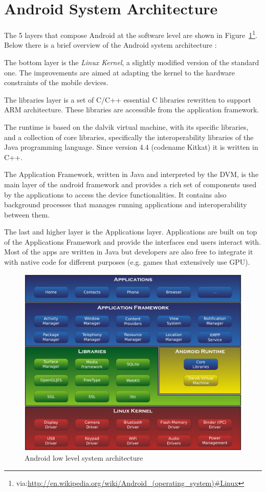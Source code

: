 \section{Android System Architecture}
\label{sec:bg_architecture}

The 5 layers that compose Android at the software level are shown in
Figure~\ref{fig:bg_architecture}\footnote{via:\url{http://en.wikipedia.org/wiki/Android\_(operating_system)\#Linux}}. Below
there is a brief overview of the Android system architecture \cite{ref13}:
\begin{enumerate*}
  \item The bottom layer is the \textit{Linux Kernel}, a slightly modified version of the standard one. The improvements are aimed at adapting the kernel to the hardware constraints of the mobile devices. 
  \item The libraries layer is a set of C/C++ essential C libraries rewritten to support ARM architecture. These libraries are accessible from the application framework. 
  \item The runtime is based on the dalvik virtual machine, with its specific libraries, and a collection of core libraries, specifically the interoperability libraries of the Java programming language. Since version 4.4 (codename Kitkat) it is written in C++. 
  \item The Application Framework, written in Java and interpreted by the DVM, is the main layer of the android framework and provides a rich set of components used by the applications to access the device functionalities. It contains also background processes that manages running applications and interoperability between them. 
  \item The last and higher layer is the Applications layer. Applications are built on top of the Applications Framework and provide the interfaces end users interact with. Most of the apps are written in Java but developers are also free to integrate it with native code for different purposes (e.g. games that extensively use GPU).
\end{enumerate*}

\begin{figure}[!h]
    \centering
    \includegraphics[width=1\textwidth]{./img/architecture/architecture.pdf}
    \caption{Android low level system architecture}
    \label{fig:bg_architecture}
\end{figure}
